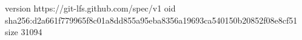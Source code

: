 version https://git-lfs.github.com/spec/v1
oid sha256:d2a661f779965f8c01a8dd855a95eba8356a19693ca540150b20852f08e8cf51
size 31094
